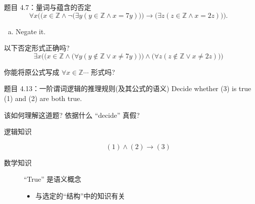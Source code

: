 \begin{frame}{}
  \begin{exampleblock}{题目 4.7：量词与蕴含的否定}
    \[
      \forall x \Big(\big(x \in \mathbb{Z} \land \lnot\big(\exists y (y \in \mathbb{Z} \land x = 7y)\big)\big)
	\to \big(\exists z (z \in \mathbb{Z} \land x = 2z)\big)\Big).
    \]
    \vspace{-0.60cm}
    \begin{enumerate}[(a)]
      \setcounter{enumi}{0}
        \item Negate it.
    \end{enumerate}
  \end{exampleblock}


  \vspace{0.50cm}
  \pause
   以下否定形式正确吗?
  \[
    \exists x \Big( \big(x \in \mathbb{Z} \land \big(\forall y (y \notin \mathbb{Z} \lor x \neq 7y)\big) \big) 
    \land \big(\forall z (z \notin \mathbb{Z} \lor x \neq 2z) \big) \Big)
  \]

  \vspace{0.20cm}
  \pause
   你能将原公式写成 $\forall x \in \mathbb{Z} \cdots$ 形式吗?
\end{frame}

\begin{frame}{}
  \begin{exampleblock}{题目 4.13：一阶谓词逻辑的推理规则(及其公式的语义)}
    Decide whether (3) is true  (1) and (2) are both true.
  \end{exampleblock}

  \pause
  \vspace{0.30cm}
   该如何理解这道题? 依据什么 ``decide'' 真假?
  
  \pause
  \begin{description}
    \item[逻辑知识] 
      \[
	(1) \land (2) \to (3)
      \]
    \pause
    \item[数学知识] ``True'' 是语义概念 
      \begin{itemize}
	\item 与选定的``结构''中的知识有关
      \end{itemize}
  \end{description}

  \pause
\end{frame}

